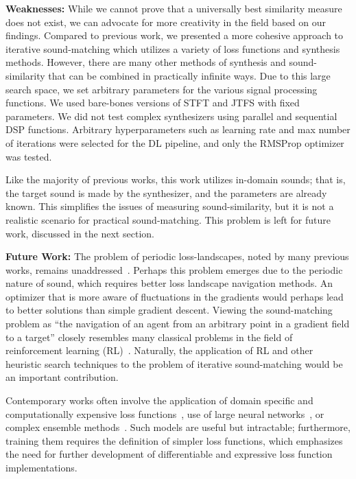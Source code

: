 \documentclass[lettersize,journal]{IEEEtran}
\begin{document}
\textbf{Weaknesses:} 
While we cannot prove that a universally best similarity measure does not exist, we can advocate for more creativity in the field based on our findings. Compared to previous work, we presented a more cohesive approach to iterative sound-matching which utilizes a variety of loss functions and synthesis methods. However, there are many other methods of synthesis and sound-similarity that can be combined in practically infinite ways. Due to this large search space, we set arbitrary parameters for the various signal processing functions. We used bare-bones versions of STFT and JTFS with fixed parameters. We did not test complex synthesizers using parallel and sequential DSP functions. Arbitrary hyperparameters such as learning rate and max number of iterations were selected for the DL pipeline, and only the RMSProp optimizer was tested. 

 Like the majority of previous works, this work utilizes in-domain sounds; that is, the target sound is made by the synthesizer, and the parameters are already known. This simplifies the issues of measuring sound-similarity, but it is not a realistic scenario for practical sound-matching. This problem is left for future work, discussed in the next section.

\label{sec:future}
\textbf{Future Work: } The problem of periodic loss-landscapes, noted by many previous works, remains unaddressed~\cite{turian2020sorry,vahidi2023mesostructures,uzrad2024diffmoog,bruford2024synthesizer}. Perhaps this problem emerges due to the periodic nature of sound, which requires better loss landscape navigation methods. An optimizer that is more aware of fluctuations in the gradients would perhaps lead to better solutions than simple gradient descent. Viewing the sound-matching problem as ``the navigation of an agent from an arbitrary point in a gradient field to a target'' closely resembles many classical problems in the field of reinforcement learning (RL)~\cite{sutton2018reinforcement}. Naturally, the application of RL and other heuristic search techniques to the problem of iterative sound-matching would be an important contribution.

Contemporary works often involve the application of domain specific and computationally expensive loss functions~\cite{han2023perceptual,uzrad2024diffmoog}, use of large neural networks~\cite{hershey2017cnn,cramer2019look}, or complex ensemble methods~\cite{turian2022hear}. Such models are useful but intractable; furthermore, training them requires the definition of simpler loss functions, which emphasizes the need for further development of differentiable and expressive loss function implementations. 
\end{document}
